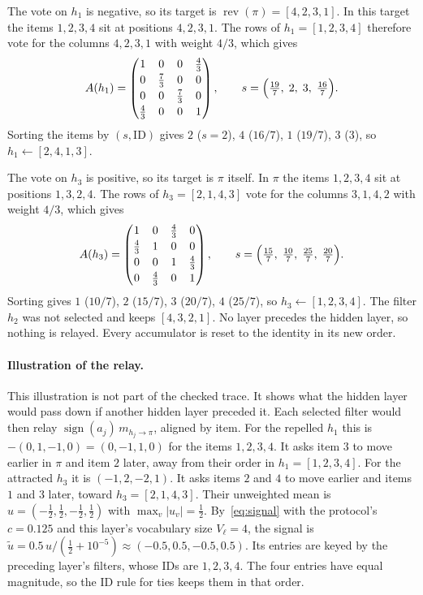 The vote on $h_1$ is negative, so its target is $\operatorname{rev}(\pi)=[4,2,3,1]$. In this target the items $1,2,3,4$ sit at positions $4,2,3,1$. The rows of $h_1=[1,2,3,4]$ therefore vote for the columns $4,2,3,1$ with weight $4/3$, which gives
\[
A(h_1)=\begin{pmatrix}1&0&0&\tfrac43\\[2pt]0&\tfrac73&0&0\\[2pt]0&0&\tfrac73&0\\[2pt]\tfrac43&0&0&1\end{pmatrix},\qquad
s=\Bigl(\tfrac{19}{7},\;2,\;3,\;\tfrac{16}{7}\Bigr).
\]
Sorting the items by $(s,\mathrm{ID})$ gives $2$ ($s=2$), $4$ ($16/7$), $1$ ($19/7$), $3$ ($3$), so $h_1\leftarrow[2,4,1,3]$.

The vote on $h_3$ is positive, so its target is $\pi$ itself. In $\pi$ the items $1,2,3,4$ sit at positions $1,3,2,4$. The rows of $h_3=[2,1,4,3]$ vote for the columns $3,1,4,2$ with weight $4/3$, which gives
\[
A(h_3)=\begin{pmatrix}1&0&\tfrac43&0\\[2pt]\tfrac43&1&0&0\\[2pt]0&0&1&\tfrac43\\[2pt]0&\tfrac43&0&1\end{pmatrix},\qquad
s=\Bigl(\tfrac{15}{7},\;\tfrac{10}{7},\;\tfrac{25}{7},\;\tfrac{20}{7}\Bigr).
\]
Sorting gives $1$ ($10/7$), $2$ ($15/7$), $3$ ($20/7$), $4$ ($25/7$), so $h_3\leftarrow[1,2,3,4]$. The filter $h_2$ was not selected and keeps $[4,3,2,1]$. No layer precedes the hidden layer, so nothing is relayed. Every accumulator is reset to the identity in its new order.

\paragraph{Illustration of the relay.} This illustration is not part of the checked trace. It shows what the hidden layer would pass down if another hidden layer preceded it. Each selected filter would then relay $\operatorname{sign}(a_j)\,m_{h_j\to\pi}$, aligned by item. For the repelled $h_1$ this is $-(0,1,-1,0)=(0,-1,1,0)$ for the items $1,2,3,4$. It asks item $3$ to move earlier in $\pi$ and item $2$ later, away from their order in $h_1=[1,2,3,4]$. For the attracted $h_3$ it is $(-1,2,-2,1)$. It asks items $2$ and $4$ to move earlier and items $1$ and $3$ later, toward $h_3=[2,1,4,3]$. Their unweighted mean is $u=(-\tfrac12,\tfrac12,-\tfrac12,\tfrac12)$ with $\max_v|u_v|=\tfrac12$. By~\eqref{eq:signal} with the protocol's $c=0.125$ and this layer's vocabulary size $V_\ell=4$, the signal is $\tilde u=0.5\,u/(\tfrac12+10^{-5})\approx(-0.5,0.5,-0.5,0.5)$. Its entries are keyed by the preceding layer's filters, whose IDs are $1,2,3,4$. The four entries have equal magnitude, so the ID rule for ties keeps them in that order.

